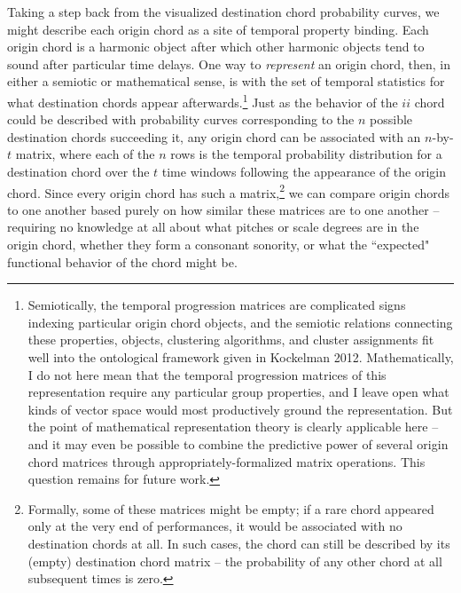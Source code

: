 Taking a step back from the visualized destination chord probability curves, we might describe each origin chord as a site of temporal property binding.
Each origin chord is a harmonic object after which other harmonic objects tend to sound after particular time delays.  One way to \emph{represent} an origin chord, then, in either a semiotic or mathematical sense, is with the set of temporal statistics for what destination chords appear afterwards.\footnote{Semiotically, the temporal progression matrices are complicated signs indexing particular origin chord objects, and the semiotic relations connecting these properties, objects, clustering algorithms, and cluster assignments fit well into the ontological framework given in Kockelman 2012.  Mathematically, I do not here mean that the temporal progression matrices of this representation require any particular group properties, and I leave open what kinds of vector space would most productively ground the representation.  But the point of mathematical representation theory is clearly applicable here -- and it may even be possible to combine the predictive power of several origin chord matrices through appropriately-formalized matrix operations.  This question remains for future work.}  Just as the behavior of the $ii$ chord could be described with probability curves corresponding to the $n$ possible destination chords succeeding it, any origin chord can be associated with an $n$-by-$t$ matrix, where each of the $n$ rows is the temporal probability distribution for a destination chord over the $t$ time windows following the appearance of the origin chord.  Since every origin chord has such a matrix,\footnote{Formally, some of these matrices might be empty; if a rare chord appeared only at the very end of performances, it would be associated with no destination chords at all.  In such cases, the chord can still be described by its (empty) destination chord matrix -- the probability of any other chord at all subsequent times is zero.} we can compare origin chords to one another based purely on how similar these matrices are to one another -- requiring no knowledge at all about what pitches or scale degrees are in the origin chord, whether they form a consonant sonority, or what the ``expected" functional behavior of the chord might be.


